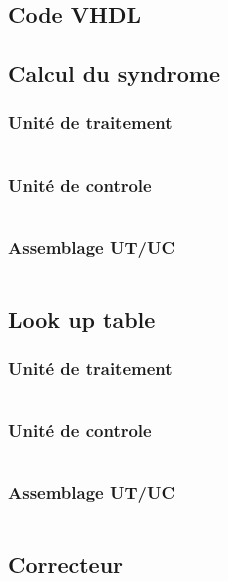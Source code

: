 \documentclass[a4paper, 11pt, svgnames]{report}
\begin{document}
    \begin{appendices}

        \chapter{Code VHDL}

        \section{Calcul du syndrome}
        \subsection{Unité de traitement}
        \inputminted[firstline=0, lastline=51,breaklines]{VHDL}{../src/ut_syndrome.vhd}
        \subsection{Unité de controle}
        \inputminted[firstline=0, lastline=81,breaklines]{VHDL}{../src/uc_syndrome.vhd}
        \subsection{Assemblage UT/UC}
        \inputminted[firstline=0, lastline=44,breaklines]{VHDL}{../src/syndrome.vhd}

        \section{Look up table}
        \subsection{Unité de traitement}
        \inputminted[firstline=0, lastline=84,breaklines]{VHDL}{../src/ut_lut.vhd}
        \subsection{Unité de controle}
        \inputminted[firstline=0, lastline=72,breaklines]{VHDL}{../src/uc_lut.vhd}
        \subsection{Assemblage UT/UC}
        \inputminted[firstline=0, lastline=90,breaklines]{VHDL}{../src/lut.vhd}

        \section{Correcteur}

\end{appendices}
\end{document}
